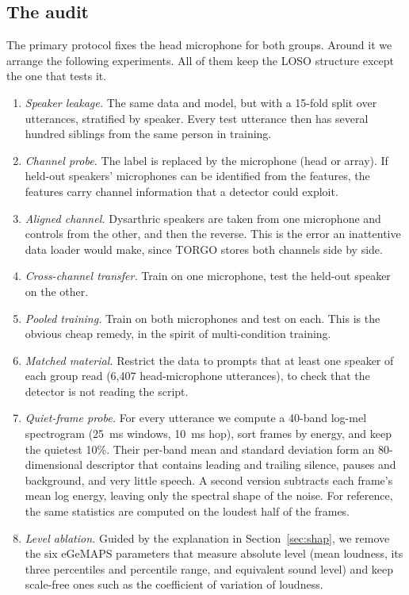 \documentclass[conference]{IEEEtran}
\begin{document}
\subsection{The audit}
\label{sec:audit}
The primary protocol fixes the head microphone for both groups. Around it we arrange the following experiments. All of them keep the LOSO structure except the one that tests it.

\begin{enumerate}
\item \emph{Speaker leakage.} The same data and model, but with a 15-fold split over utterances, stratified by speaker. Every test utterance then has several hundred siblings from the same person in training.
\item \emph{Channel probe.} The label is replaced by the microphone (head or array). If held-out speakers' microphones can be identified from the features, the features carry channel information that a detector could exploit.
\item \emph{Aligned channel.} Dysarthric speakers are taken from one microphone and controls from the other, and then the reverse. This is the error an inattentive data loader would make, since TORGO stores both channels side by side.
\item \emph{Cross-channel transfer.} Train on one microphone, test the held-out speaker on the other.
\item \emph{Pooled training.} Train on both microphones and test on each. This is the obvious cheap remedy, in the spirit of multi-condition training.
\item \emph{Matched material.} Restrict the data to prompts that at least one speaker of each group read (6,407 head-microphone utterances), to check that the detector is not reading the script.
\item \emph{Quiet-frame probe.} For every utterance we compute a 40-band log-mel spectrogram (25~ms windows, 10~ms hop), sort frames by energy, and keep the quietest 10\%. Their per-band mean and standard deviation form an 80-dimensional descriptor that contains leading and trailing silence, pauses and background, and very little speech. A second version subtracts each frame's mean log energy, leaving only the spectral shape of the noise. For reference, the same statistics are computed on the loudest half of the frames.
\item \emph{Level ablation.} Guided by the explanation in Section~\ref{sec:shap}, we remove the six eGeMAPS parameters that measure absolute level (mean loudness, its three percentiles and percentile range, and equivalent sound level) and keep scale-free ones such as the coefficient of variation of loudness.
\end{enumerate}
\end{document}
